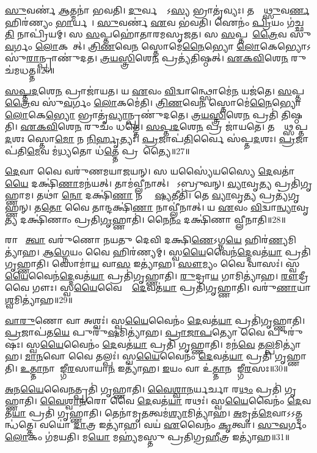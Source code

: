 \ul{𑌸𑍁}𑌵𑌰𑍍𑌣॑ \ul{𑌆}𑌤𑍍𑌮𑌨𑌾॑ 𑌭𑌵𑌤𑌿।
\ul{𑌦𑍁}𑌰𑍍𑌵𑌰𑍍𑌣𑍋᳚\-𑌽\ul{𑌸𑍍𑌯} 𑌭𑍍𑌰𑌾𑌤𑍃॑𑌵𑍍𑌯𑌃।
𑌤𑌸𑍍𑌮𑌾᳚\ul{𑌥𑍍𑌸𑍁}𑌵\ul{𑌰𑍍𑌣}\ul{} 𑌹𑌿𑌰॑𑌣𑍍𑌯𑌂 \ul{𑌭𑌾}𑌰𑍍𑌯𑌮𑍍᳚।
\ul{𑌸𑍁}𑌵𑌰𑍍𑌣॑ \ul{𑌏}𑌵 𑌭॑𑌵𑌤𑌿।
𑌐𑌨𑌂॑ \ul{𑌪𑍍𑌰𑌿}𑌯𑌂 𑌗॑𑌚𑍍𑌛\ul{𑌤𑌿} 𑌨𑌾𑌪𑍍𑌰𑌿॑𑌯𑌮𑍍।
𑌸 \ul{𑌸}𑌪𑍍𑌤𑌹𑍋॑𑌤𑌾𑌰𑌮𑌸𑍃𑌜𑌤।
𑌸 \ul{𑌸}𑌪𑍍𑌤𑌹𑍋᳚\ul{𑌤𑍍𑌰𑍈}𑌵 𑌸𑍁॑\ul{𑌵}𑌰𑍍𑌗𑌂 \ul{𑌲𑍋}𑌕𑌮𑍈᳚𑌤𑍍।
\ul{𑌤𑍍𑌰𑌿}\ul{𑌣}𑌵𑍇\ul{𑌨} 𑌸𑍍𑌤𑍋𑌮𑍇॑\ul{𑌨𑍈}𑌭𑍍𑌯𑍋 \ul{𑌲𑍋}𑌕𑍇𑌭𑍍𑌯𑍋\-𑌽𑌸𑍁॑\ul{𑌰𑌾}𑌨𑍍𑌪𑍍𑌰𑌾𑌣𑍁॑𑌦𑌤।
\ul{𑌤𑍍𑌰}\ul{𑌯}\ul{𑌸𑍍𑌤𑍍𑌰𑌿}\ul{}𑌶𑍇\ul{𑌨} 𑌪𑍍𑌰𑌤𑍍𑌯॑𑌤𑌿𑌷𑍍𑌠𑌤𑍍।
\ul{𑌏}\ul{𑌕}\ul{𑌵𑌿}\ul{}𑌶𑍇\ul{𑌨} 𑌰𑍁𑌚॑𑌮𑌧𑌤𑍍𑌤॥26॥

\ul{𑌸}\ul{𑌪𑍍𑌤}\ul{𑌦}𑌶𑍇\ul{𑌨} 𑌪𑍍𑌰𑌾𑌜𑌾॑𑌯𑌤।
𑌯 \ul{𑌏}𑌵𑌂 \ul{𑌵𑌿}𑌦𑍍𑌵𑌾𑌨𑍍𑌥𑍍𑌸𑍋𑌮𑍇॑\ul{𑌨} 𑌯𑌜॑𑌤𑍇।
\ul{𑌸}𑌪𑍍𑌤𑌹𑍋᳚\ul{𑌤𑍍𑌰𑍈}𑌵 𑌸𑍁॑\ul{𑌵}𑌰𑍍𑌗𑌂 \ul{𑌲𑍋}𑌕𑌮𑍇॑𑌤𑌿।
\ul{𑌤𑍍𑌰𑌿}\ul{𑌣}𑌵𑍇\ul{𑌨} 𑌸𑍍𑌤𑍋𑌮𑍇॑\ul{𑌨𑍈}𑌭𑍍𑌯𑍋 \ul{𑌲𑍋}𑌕𑍇\ul{𑌭𑍍𑌯𑍋} 𑌭𑍍𑌰𑌾𑌤𑍃॑\ul{𑌵𑍍𑌯𑌾}𑌨𑍍𑌪𑍍𑌰𑌣𑍁॑𑌦𑌤𑍇।
\ul{𑌤𑍍𑌰}\ul{𑌯}\ul{𑌸𑍍𑌤𑍍𑌰𑌿}\ul{}𑌶𑍇\ul{𑌨} 𑌪𑍍𑌰𑌤𑌿॑ 𑌤𑌿𑌷𑍍𑌠𑌤𑌿।
\ul{𑌏}\ul{𑌕}\ul{𑌵𑌿}\ul{}𑌶𑍇\ul{𑌨} 𑌰𑍁𑌚𑌂॑ 𑌧𑌤𑍍𑌤𑍇।
\ul{𑌸}\ul{𑌪𑍍𑌤}\ul{𑌦}𑌶𑍇\ul{𑌨} 𑌪𑍍𑌰 𑌜𑌾॑𑌯𑌤𑍇।
𑌤𑌸𑍍𑌮𑌾᳚𑌥𑍍𑌸𑌪𑍍𑌤\ul{𑌦}𑌶𑌃 𑌸𑍍𑌤𑍋\ul{𑌮𑍋} 𑌨 \ul{𑌨𑌿}\ul{𑌰𑍍}𑌹𑍃𑌤𑍍𑌯𑌃॑।
\ul{𑌪𑍍𑌰}𑌜𑌾𑌪॑\ul{𑌤𑌿}𑌰𑍍𑌵𑍈 𑌸॑𑌪𑍍𑌤\ul{𑌦}𑌶𑌃।
\ul{𑌪𑍍𑌰}𑌜𑌾𑌪॑𑌤𑌿\ul{𑌮𑍇}𑌵 𑌮॑\ul{𑌧𑍍𑌯}𑌤𑍋 𑌧॑\ul{𑌤𑍍𑌤𑍇} 𑌪𑍍𑌰𑌜𑌾᳚𑌤𑍍𑌯𑍈॥27॥\anuvakamend[\ul{𑌅}\ul{𑌨}\ul{𑌨𑍍𑌦}𑌦𑍍𑌭𑍁\ul{𑌵} 𑌇\ul{𑌤𑌿} 𑌵𑍍𑌯𑌾𑌹॑\ul{𑌰}𑌦𑍍𑌵𑍇𑌦𑌾॑\ul{𑌸𑍀}𑌦𑍍𑌵𑍇𑌦𑌾॑𑌧\ul{𑌤𑍍𑌤} 𑌪𑍍𑌰𑌜𑌾᳚𑌤𑍍𑌯𑍈]

\ul{𑌦𑍇}𑌵𑌾 𑌵𑍈 𑌵𑌰𑍁॑𑌣𑌮𑌯𑌾𑌜𑌯𑌨𑍍।
𑌸 𑌯𑌸𑍍𑌯𑍈॑𑌯𑌸𑍍𑌯𑍈 \ul{𑌦𑍇}𑌵𑌤𑌾॑\ul{𑌯𑍈} 𑌦𑌕𑍍𑌷𑌿॑\ul{𑌣𑌾}𑌮𑌨॑𑌯𑌤𑍍।
𑌤𑌾𑌮॑𑌵𑍍𑌲𑍀𑌨𑌾𑌤𑍍।
𑌤𑍇᳚𑌽𑌬𑍍𑌰𑍁𑌵𑌨𑍍।
\ul{𑌵𑍍𑌯𑌾}𑌵𑍃\ul{𑌤𑍍𑌯} 𑌪𑍍𑌰𑌤𑌿॑\-𑌗𑍃𑌹𑍍𑌣𑌾𑌮।
𑌤𑌥𑌾॑ \ul{𑌨𑍋} 𑌦𑌕𑍍𑌷𑌿॑\ul{𑌣𑌾} 𑌨 𑌵𑍍𑌲𑍇᳚\ul{𑌷𑍍𑌯}𑌤𑍀𑌤𑌿॑।
𑌤𑍇 \ul{𑌵𑍍𑌯𑌾}𑌵𑍃\ul{𑌤𑍍𑌯} 𑌪𑍍𑌰𑌤𑍍𑌯॑𑌗𑍃𑌹𑍍𑌣𑌨𑍍।
𑌤\ul{𑌤𑍋} 𑌵𑍈 𑌤𑌾𑌨𑍍𑌦𑌕𑍍𑌷𑌿॑\ul{𑌣𑌾} 𑌨𑌾𑌵𑍍𑌲𑍀॑𑌨𑌾𑌤𑍍।
𑌯 \ul{𑌏}𑌵𑌂 \ul{𑌵𑌿}𑌦𑍍𑌵𑌾\ul{𑌨𑍍𑌵𑍍𑌯𑌾}𑌵𑍃\ul{𑌤𑍍𑌯} 𑌦𑌕𑍍𑌷𑌿॑𑌣𑌾𑌂 𑌪𑍍𑌰𑌤𑌿\ul{𑌗𑍃}𑌹𑍍𑌣𑌾𑌤𑌿॑।
𑌨𑍈\ul{𑌨𑌂} 𑌦𑌕𑍍𑌷𑌿॑𑌣𑌾 𑌵𑍍𑌲𑍀𑌨𑌾𑌤𑌿॥28॥

𑌰𑌾𑌜𑌾᳚ \ul{𑌤𑍍𑌵𑌾} 𑌵𑌰𑍁॑𑌣𑍋 𑌨𑌯𑌤𑍁 𑌦𑍇𑌵𑌿 𑌦𑌕𑍍𑌷𑌿\ul{𑌣𑍇}\-𑌽𑌗𑍍𑌨\ul{𑌯𑍇} 𑌹𑌿𑌰॑\ul{𑌣𑍍𑌯}𑌮𑌿𑌤𑍍𑌯𑌾॑𑌹।
\ul{𑌆}\ul{𑌗𑍍𑌨𑍇}𑌯𑌂 𑌵𑍈 𑌹𑌿𑌰॑𑌣𑍍𑌯𑌮𑍍।
𑌸𑍍𑌵\ul{𑌯𑍈}𑌵𑍈𑌨॑\ul{𑌦𑍍𑌦𑍇}𑌵𑌤॑\ul{𑌯𑌾} 𑌪𑍍𑌰𑌤𑌿॑\-𑌗𑍃𑌹𑍍𑌣𑌾𑌤𑌿।
𑌸𑍋𑌮𑌾॑\ul{𑌯} 𑌵𑌾\ul{𑌸} 𑌇𑌤𑍍𑌯𑌾॑𑌹।
\ul{𑌸𑍗}𑌮𑍍𑌯𑌂 𑌵𑍈 𑌵𑌾𑌸𑌃॑।
𑌸𑍍𑌵\ul{𑌯𑍈}𑌵𑍈𑌨॑\ul{𑌦𑍍𑌦𑍇}𑌵𑌤॑\ul{𑌯𑌾} 𑌪𑍍𑌰𑌤𑌿॑\-𑌗𑍃𑌹𑍍𑌣𑌾𑌤𑌿।
\ul{𑌰𑍁}𑌦𑍍𑌰𑌾\ul{𑌯} 𑌗𑌾𑌮𑌿𑌤𑍍𑌯𑌾॑𑌹।
\ul{𑌰𑍗}𑌦𑍍𑌰𑍀 𑌵𑍈 𑌗𑍗𑌃।
𑌸𑍍𑌵\ul{𑌯𑍈}𑌵𑍈𑌨𑌾𑌂᳚ \ul{𑌦𑍇}𑌵𑌤॑\ul{𑌯𑌾} 𑌪𑍍𑌰𑌤𑌿॑\-𑌗𑍃𑌹𑍍𑌣𑌾𑌤𑌿।
𑌵𑌰𑍁॑\ul{𑌣𑌾}𑌯𑌾\ul{𑌶𑍍𑌵}𑌮𑌿𑌤𑍍𑌯𑌾॑𑌹॥29॥

\ul{𑌵𑌾}\ul{𑌰𑍁}𑌣𑍋 𑌵𑌾 𑌅𑌶𑍍𑌵𑌃॑।
𑌸𑍍𑌵\ul{𑌯𑍈}𑌵𑍈𑌨𑌂॑ \ul{𑌦𑍇}𑌵𑌤॑\ul{𑌯𑌾} 𑌪𑍍𑌰𑌤𑌿॑\-𑌗𑍃𑌹𑍍𑌣𑌾𑌤𑌿।
\ul{𑌪𑍍𑌰}𑌜𑌾𑌪॑𑌤\ul{𑌯𑍇} 𑌪𑍁𑌰𑍁॑\ul{𑌷}𑌮𑌿𑌤𑍍𑌯𑌾॑𑌹।
\ul{𑌪𑍍𑌰𑌾}\ul{𑌜𑌾}\ul{𑌪}𑌤𑍍𑌯𑍋 𑌵𑍈 𑌪𑍁𑌰𑍁॑𑌷𑌃।
𑌸𑍍𑌵\ul{𑌯𑍈}𑌵𑍈𑌨𑌂॑ \ul{𑌦𑍇}𑌵𑌤॑\ul{𑌯𑌾} 𑌪𑍍𑌰𑌤𑌿॑ 𑌗𑍃𑌹𑍍𑌣𑌾𑌤𑌿।
𑌮𑌨॑\ul{𑌵𑍇} 𑌤\ul{𑌲𑍍𑌪}𑌮𑌿𑌤𑍍𑌯𑌾॑𑌹।
\ul{𑌮𑌾}\ul{𑌨}𑌵𑍋 𑌵𑍈 𑌤𑌲𑍍𑌪𑌃॑।
𑌸𑍍𑌵\ul{𑌯𑍈}𑌵𑍈𑌨𑌂॑ \ul{𑌦𑍇}𑌵𑌤॑\ul{𑌯𑌾} 𑌪𑍍𑌰𑌤𑌿॑ 𑌗𑍃𑌹𑍍𑌣𑌾𑌤𑌿।
\ul{𑌉}\ul{𑌤𑍍𑌤𑌾}𑌨𑌾𑌯𑌾᳚𑌙𑍍𑌗𑍀\ul{𑌰}𑌸𑌾𑌯𑌾\ul{𑌨} 𑌇𑌤𑍍𑌯𑌾॑𑌹।
\ul{𑌇}𑌯𑌂 𑌵𑌾 𑌉॑\ul{𑌤𑍍𑌤𑌾}𑌨 𑌆᳚𑌙𑍍𑌗𑍀\ul{𑌰}𑌸𑌃॥30॥

\ul{𑌅}𑌨\ul{𑌯𑍈}𑌵𑍈\ul{𑌨}𑌤𑍍𑌪𑍍𑌰𑌤𑌿॑ 𑌗𑍃𑌹𑍍𑌣𑌾𑌤𑌿।
\ul{𑌵𑍈}\ul{𑌶𑍍𑌵𑌾}\ul{𑌨}𑌰𑍍𑌯𑌰𑍍𑌚𑌾 𑌰\ul{𑌥𑌂} 𑌪𑍍𑌰𑌤𑌿॑ 𑌗𑍃𑌹𑍍𑌣𑌾𑌤𑌿।
\ul{𑌵𑍈}\ul{𑌶𑍍𑌵𑌾}\ul{𑌨}𑌰𑍋 𑌵𑍈 \ul{𑌦𑍇}𑌵𑌤॑\ul{𑌯𑌾} 𑌰𑌥𑌃॑।
𑌸𑍍𑌵\ul{𑌯𑍈}𑌵𑍈𑌨𑌂॑ \ul{𑌦𑍇}𑌵𑌤॑\ul{𑌯𑌾} 𑌪𑍍𑌰𑌤𑌿॑ 𑌗𑍃𑌹𑍍𑌣𑌾𑌤𑌿।
𑌤𑍇𑌨𑌾॑𑌮𑍃\ul{𑌤}𑌤𑍍𑌵𑌮॑\ul{𑌶𑍍𑌯𑌾}𑌮𑌿𑌤𑍍𑌯𑌾॑𑌹।
\ul{𑌅}𑌮𑍃𑌤॑\ul{𑌮𑍇}𑌵𑌾𑌽𑌽𑌤𑍍𑌮𑌨𑍍𑌧॑𑌤𑍍𑌤𑍇।
𑌵𑌯𑍋॑ \ul{𑌦𑌾}𑌤𑍍𑌰 𑌇𑌤𑍍𑌯𑌾॑𑌹।
𑌵𑌯॑ \ul{𑌏}𑌵𑍈𑌨𑌂॑ \ul{𑌕𑍃}𑌤𑍍𑌵𑌾।
\ul{𑌸𑍁}\ul{𑌵}𑌰𑍍𑌗𑌂 \ul{𑌲𑍋}𑌕𑌂 𑌗॑𑌮𑌯𑌤𑌿।
𑌮\ul{𑌯𑍋} 𑌮𑌹𑍍𑌯॑𑌮𑌸𑍍𑌤𑍁 𑌪𑍍𑌰𑌤𑌿𑌗𑍍𑌰\ul{𑌹𑍀}𑌤𑍍𑌰 𑌇𑌤𑍍𑌯𑌾॑𑌹॥31॥

